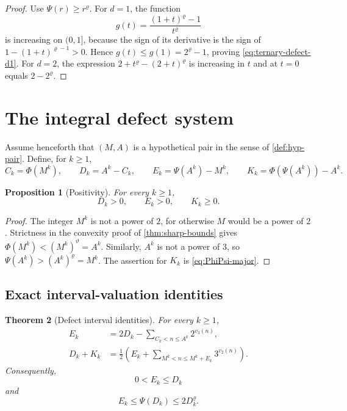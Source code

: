 \documentclass[11pt]{article}
\newtheorem{theorem}{Theorem}[section]
\newtheorem{proposition}[theorem]{Proposition}
\theoremstyle{definition}
\begin{document}
\begin{proof}
Use \(\Psi(r)\ge r^\varrho\).  For \(d=1\), the function
\[
 g(t)=\frac{(1+t)^\varrho-1}{t^\varrho}
\]
is increasing on \((0,1]\), because the sign of its derivative is the sign
of \(1-(1+t)^{\varrho-1}>0\).  Hence
\(g(t)\le g(1)=2^\varrho-1\), proving
\cref{eq:ternary-defect-d1}.  For \(d=2\), the expression
\(2+t^\varrho-(2+t)^\varrho\) is increasing in \(t\) and at \(t=0\)
equals \(2-2^\varrho\).
\end{proof}

\section{The integral defect system}
\label{sec:defects}

Assume henceforth that \((M,A)\) is a hypothetical pair in the sense of
\cref{def:hyp-pair}.  Define, for \(k\ge1\),
\begin{equation}\label{eq:defect-defs}
 C_k=\Phi(M^k),\qquad
 D_k=A^k-C_k,
 \qquad
 E_k=\Psi(A^k)-M^k,
 \qquad
 K_k=\Phi(\Psi(A^k))-A^k.
\end{equation}

\begin{proposition}[Positivity]\label{prop:defect-positive}
For every \(k\ge1\),
\begin{equation}\label{eq:defect-signs}
  D_k>0,
  \qquad E_k>0,
  \qquad K_k\ge0.
\end{equation}
\end{proposition}

\begin{proof}
The integer \(M^k\) is not a power of \(2\), for otherwise \(M\) would be a
power of \(2\).  Strictness in the convexity proof of
\cref{thm:sharp-bounds} gives
\(\Phi(M^k)<(M^k)^\vartheta=A^k\).  Similarly, \(A^k\) is not a power of
\(3\), so \(\Psi(A^k)>(A^k)^\varrho=M^k\).  The assertion for \(K_k\) is
\cref{eq:PhiPsi-major}.
\end{proof}

\subsection{Exact interval-valuation identities}

\begin{theorem}[Defect interval identities]\label{thm:defect-interval}
For every \(k\ge1\),
\begin{align}
 E_k
 &=2D_k-
   \sum_{C_k<n\le A^k}2^{v_3(n)},
 \label{eq:E-interval}\\
 D_k+K_k
 &=\frac12\left(
 E_k+
 \sum_{M^k<n\le M^k+E_k}3^{v_2(n)}
 \right).
 \label{eq:DK-interval}
\end{align}
Consequently,
\begin{equation}\label{eq:E-le-D}
 0<E_k\le D_k
\end{equation}
and
\begin{equation}\label{eq:E-PsiD}
 E_k\le\Psi(D_k)\le2D_k^\varrho.
\end{equation}
\end{theorem}
\end{document}
